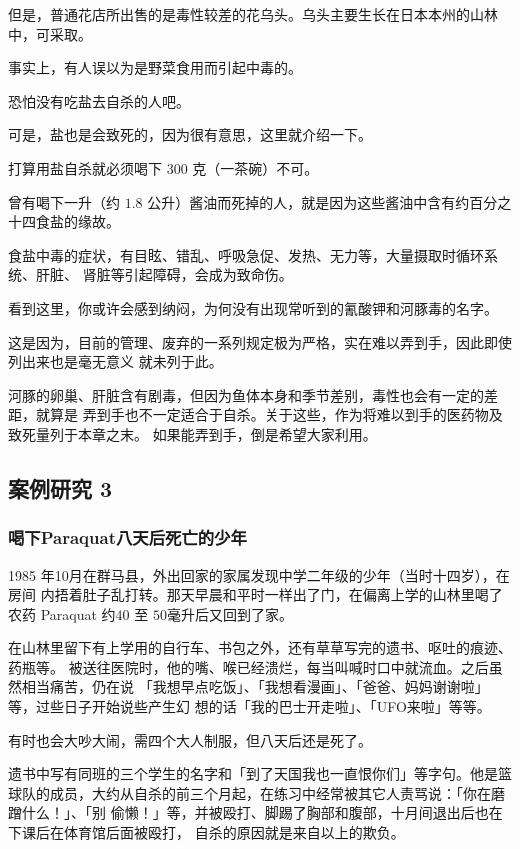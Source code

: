 \documentclass[UTF8]{ctexart}
\begin{document}
但是，普通花店所出售的是毒性较差的花乌头。乌头主要生长在日本本州的山林中，可采取。

事实上，有人误以为是野菜食用而引起中毒的。

恐怕没有吃盐去自杀的人吧。

可是，盐也是会致死的，因为很有意思，这里就介绍一下。

打算用盐自杀就必须喝下 $300$ 克（一茶碗）不可。

曾有喝下一升（约 $1.8$ 公升）酱油而死掉的人，就是因为这些酱油中含有约百分之十四食盐的缘故。

食盐中毒的症状，有目眩、错乱、呼吸急促、发热、无力等，大量摄取时循环系统、肝脏、
肾脏等引起障碍，会成为致命伤。

看到这里，你或许会感到纳闷，为何没有出现常听到的氰酸钾和河豚毒的名字。

这是因为，目前的管理、废弃的一系列规定极为严格，实在难以弄到手，因此即使列出来也是毫无意义
就未列于此。

河豚的卵巢、肝脏含有剧毒，但因为鱼体本身和季节差别，毒性也会有一定的差距，就算是 弄到手也不一定适合于自杀。关于这些，作为将难以到手的医药物及致死量列于本章之末。 如果能弄到手，倒是希望大家利用。

\subsection{案例研究 3}
\subsubsection*{喝下Paraquat八天后死亡的少年}

1985 年10月在群马县，外出回家的家属发现中学二年级的少年（当时十四岁），在房间
内捂着肚子乱打转。那天早晨和平时一样出了门，在偏离上学的山林里喝了农药
Paraquat 约$40$ 至 $50$毫升后又回到了家。

在山林里留下有上学用的自行车、书包之外，还有草草写完的遗书、呕吐的痕迹、药瓶等。
被送往医院时，他的嘴、喉已经溃烂，每当叫喊时口中就流血。之后虽然相当痛苦，仍在说
「我想早点吃饭」、「我想看漫画」、「爸爸、妈妈谢谢啦」等，过些日子开始说些产生幻
想的话「我的巴士开走啦」、「UFO来啦」等等。

有时也会大吵大闹，需四个大人制服，但八天后还是死了。

遗书中写有同班的三个学生的名字和「到了天国我也一直恨你们」等字句。他是篮球队的成员，大约从自杀的前三个月起，在练习中经常被其它人责骂说：「你在磨蹭什么！」、「别 偷懒！」等，并被殴打、脚踢了胸部和腹部，十月间退出后也在下课后在体育馆后面被殴打， 自杀的原因就是来自以上的欺负。
\end{document}
